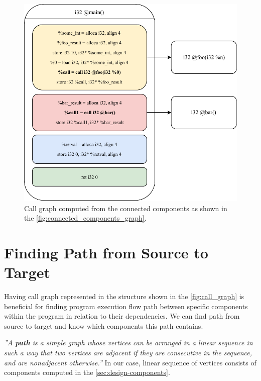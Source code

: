 \documentclass[12pt, twoside]{fithesis2}
\renewcommand{\_}{\leavevmode \kern0.07em\vbox{\hrule width0.4em}}
\begin{document}
\begin{figure}[ht]
    \centering
    \includegraphics[]{images/main_callgraph.pdf}
    \caption{Call graph computed from the connected components
    as shown in the \autoref{fig:connected_components_graph}.}
    \label{fig:call_graph}
\end{figure}


\section{Finding Path from Source to Target}
\label{sec:design-path}


Having call graph represented in the structure shown in the
\autoref{fig:call_graph} is beneficial for finding program execution flow path
between specific components within the program in relation to their
dependencies. We can find path from source to target and know which components
this path contains.


\emph{''A \textbf{path} is a simple graph whose vertices can be arranged in a linear sequence in
such a way that two vertices are adjacent if they are consecutive in the sequence,
and are nonadjacent otherwise.''}\cite{graph_theory} In our case, linear
sequence of vertices consists of components computed in the
\autoref{sec:design-components}.
\end{document}
